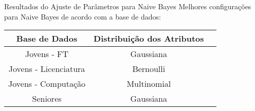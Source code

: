 \begin{frame}{Resultados do Ajuste de Parâmetros para Naive Bayes}
    Melhores configurações para Naive Bayes de acordo com a base de dados: 
    \begin{table}
    \begin{center}
    \begin{tabular}[c]{| c | c | c |}
        \hline
        \textbf{Base de Dados} & \textbf{Distribuição dos Atributos} \\
        \hline
        Jovens - FT & Gaussiana \\
        \hline
        Jovens - Licenciatura & Bernoulli \\
        \hline
        Jovens - Computação & Multinomial \\
        \hline
        Seniores & Gaussiana \\
        \hline
    \end{tabular}
    \end{center}
    \label{conf_nb}
    \end{table}
\end{frame}

